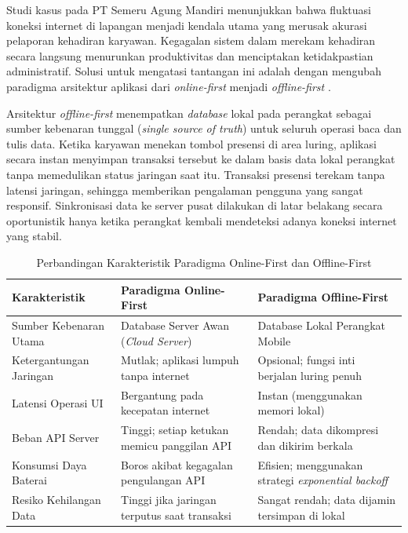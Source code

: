Studi kasus pada PT Semeru Agung Mandiri menunjukkan bahwa fluktuasi koneksi internet di lapangan menjadi kendala utama yang merusak akurasi pelaporan kehadiran karyawan. Kegagalan sistem dalam merekam kehadiran secara langsung menurunkan produktivitas dan menciptakan ketidakpastian administratif. Solusi untuk mengatasi tantangan ini adalah dengan mengubah paradigma arsitektur aplikasi dari \textit{online-first} menjadi \textit{offline-first} \cite{researchgate2024_offline}.

Arsitektur \textit{offline-first} menempatkan \textit{database} lokal pada perangkat sebagai sumber kebenaran tunggal (\textit{single source of truth}) untuk seluruh operasi baca dan tulis data. Ketika karyawan menekan tombol presensi di area luring, aplikasi secara instan menyimpan transaksi tersebut ke dalam basis data lokal perangkat tanpa memedulikan status jaringan saat itu. Transaksi presensi terekam tanpa latensi jaringan, sehingga memberikan pengalaman pengguna yang sangat responsif. Sinkronisasi data ke server pusat dilakukan di latar belakang secara oportunistik hanya ketika perangkat kembali mendeteksi adanya koneksi internet yang stabil.

\begin{table}[ht]
\centering
\caption{Perbandingan Karakteristik Paradigma Online-First dan Offline-First}
\label{tab:perbandingan_paradigma}
\begin{tabular}{|l|p{5cm}|p{5cm}|}
\hline
\textbf{Karakteristik} & \textbf{Paradigma Online-First} & \textbf{Paradigma Offline-First} \\ \hline
Sumber Kebenaran Utama & Database Server Awan (\textit{Cloud Server}) & Database Lokal Perangkat Mobile \\ \hline
Ketergantungan Jaringan & Mutlak; aplikasi lumpuh tanpa internet & Opsional; fungsi inti berjalan luring penuh \\ \hline
Latensi Operasi UI & Bergantung pada kecepatan internet & Instan (menggunakan memori lokal) \\ \hline
Beban API Server & Tinggi; setiap ketukan memicu panggilan API & Rendah; data dikompresi dan dikirim berkala \\ \hline
Konsumsi Daya Baterai & Boros akibat kegagalan pengulangan API & Efisien; menggunakan strategi \textit{exponential backoff} \\ \hline
Resiko Kehilangan Data & Tinggi jika jaringan terputus saat transaksi & Sangat rendah; data dijamin tersimpan di lokal \\ \hline
\end{tabular}
\end{table}

